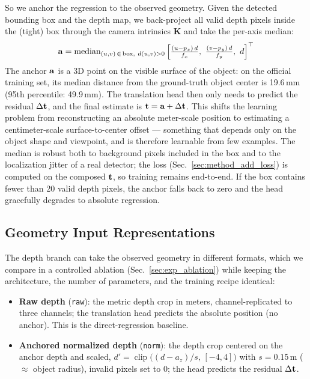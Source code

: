 So we anchor the regression to the observed geometry. Given the detected bounding box and the depth map, we back-project all valid depth pixels inside the (tight) box through the camera intrinsics $\mathbf{K}$ and take the per-axis median:
\begin{equation}
    \mathbf{a} = \operatorname{median}_{(u,v)\,\in\,\text{box},\ d(u,v)>0}
    \left[ \tfrac{(u-p_x)\,d}{f_x},\ \tfrac{(v-p_y)\,d}{f_y},\ d \right]^\top
    \label{eq:anchor}
\end{equation}
The anchor $\mathbf{a}$ is a 3D point on the visible surface of the object: on the official training set, its median distance from the ground-truth object center is 19.6\,mm (95th percentile: 49.9\,mm). The translation head then only needs to predict the residual $\Delta\mathbf{t}$, and the final estimate is $\mathbf{t} = \mathbf{a} + \Delta\mathbf{t}$. This shifts the learning problem from reconstructing an absolute meter-scale position to estimating a centimeter-scale surface-to-center offset --- something that depends only on the object shape and viewpoint, and is therefore learnable from few examples. The median is robust both to background pixels included in the box and to the localization jitter of a real detector; the loss (Sec.~\ref{sec:method_add_loss}) is computed on the composed $\mathbf{t}$, so training remains end-to-end. If the box contains fewer than 20 valid depth pixels, the anchor falls back to zero and the head gracefully degrades to absolute regression.

\subsection{Geometry Input Representations}
\label{sec:method_geometry_inputs}

The depth branch can take the observed geometry in different formats, which we compare in a controlled ablation (Sec.~\ref{sec:exp_ablation}) while keeping the architecture, the number of parameters, and the training recipe identical:

\begin{itemize}
    \item \textbf{Raw depth} (\texttt{raw}): the metric depth crop in meters, channel-replicated to three channels; the translation head predicts the absolute position (no anchor). This is the direct-regression baseline.
    \item \textbf{Anchored normalized depth} (\texttt{norm}): the depth crop centered on the anchor depth and scaled, $d' = \operatorname{clip}\!\big((d - a_z)/s,\,[-4,4]\big)$ with $s = 0.15$\,m ($\approx$ object radius), invalid pixels set to $0$; the head predicts the residual $\Delta\mathbf{t}$.
\end{itemize}

